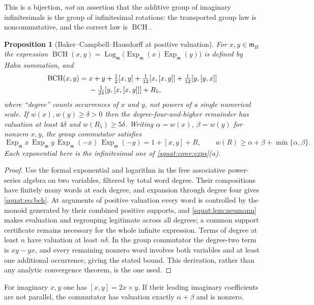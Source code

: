 \documentclass[11pt,letterpaper]{article}
\numberwithin{equation}{section}
\newtheorem{proposition}[proposition]{Proposition}
\theoremstyle{definition}
\theoremstyle{remark}
\newcommand{\mm}{\mathfrak m}
\newcommand{\Exp}{\operatorname{Exp}}
\newcommand{\Log}{\operatorname{Log}}
\newcommand{\Expm}{\Exp_{\mm}}
\newcommand{\Logm}{\Log_{\mm}}
\newcommand{\BCH}{\operatorname{BCH}}
\begin{document}
This is a bijection, \emph{not} an assertion that the additive group of imaginary
infinitesimals is the group of infinitesimal rotations: the transported group law is
noncommutative, and the correct law is $\BCH$.

\begin{proposition}[Baker--Campbell--Hausdorff at positive valuation]\label{squat:prop:bch}
For $x,y\in\mm_H$ the expression
$\BCH(x,y)=\Logm\bigl(\Expm(x)\Expm(y)\bigr)$ is defined by Hahn summation, and
\begin{align}\label{squat:eq:bch}
 \BCH(x,y)={}&x+y+\tfrac12[x,y]
 +\tfrac1{12}[x,[x,y]]+\tfrac1{12}[y,[y,x]]\notag\\
 &-\tfrac1{24}[y,[x,[x,y]]]+R_5 ,
\end{align}
where ``degree'' counts occurrences of $x$ and $y$, not powers of a single numerical
scale. If $w(x),w(y)\ge\delta>0$ then the degree-four-and-higher remainder has valuation
at least $4\delta$ and $w(R_5)\ge5\delta$. Writing $\alpha=w(x)$, $\beta=w(y)$ for nonzero
$x,y$, the group commutator satisfies
\begin{equation}\label{squat:eq:groupcomm}
 \Expm x\,\Expm y\,\Expm(-x)\,\Expm(-y)=1+[x,y]+R,
 \qquad w(R)\ge\alpha+\beta+\min\{\alpha,\beta\} .
\end{equation}
Each exponential here is the infinitesimal one of \cref{squat:conv:exps}(a).
\end{proposition}
\begin{proof}
Use the formal exponential and logarithm in the free associative power-series algebra on
two variables, filtered by total word degree. Their compositions have finitely many words
at each degree, and expansion through degree four gives \cref{squat:eq:bch}. At arguments
of positive valuation every word is controlled by the monoid generated by their combined
positive supports, and \cref{squat:lem:neumann} makes evaluation and regrouping legitimate
across all degrees; a common support certificate remains necessary for the whole infinite
expression. Terms of degree at least $n$ have valuation at least $n\delta$. In the group
commutator the degree-two term is $xy-yx$, and every remaining nonzero word involves both
variables and at least one additional occurrence, giving the stated bound. This derivation,
rather than any analytic convergence theorem, is the one used.
\end{proof}

For imaginary $x,y$ one has $[x,y]=2x\times y$. If their leading imaginary coefficients
are not parallel, the commutator has valuation exactly $\alpha+\beta$ and is nonzero.
\end{document}
